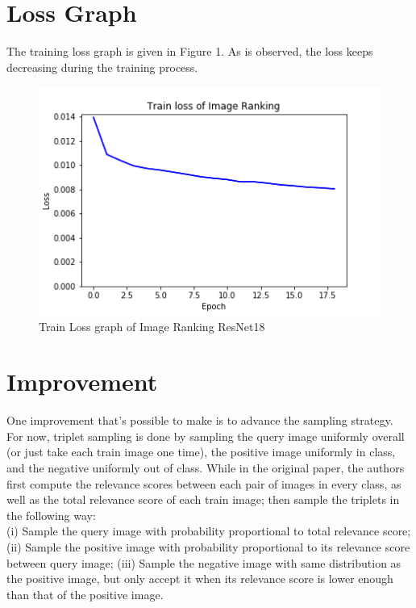 \documentclass[15pt]{article}
\begin{document}
\section{Loss Graph}
The training loss graph is given in Figure 1. As is observed, the loss keeps decreasing during the training process.
\begin{figure}
\centering
\includegraphics[width=\textwidth]{"Train_Loss_Plot"}
\caption{Train Loss graph of Image Ranking ResNet18}
\end{figure}

\section{Improvement}
One improvement that's possible to make is to advance the sampling strategy. \\
For now, triplet sampling is done by sampling the query image uniformly overall (or just take each train image one time), the positive image uniformly in class, and the negative uniformly out of class. While in the original paper, the authors first compute the relevance scores between each pair of images in every class, as well as the total relevance score of each train image; then sample the triplets in the following way: \\
(i) Sample the query image with probability proportional to total relevance score; (ii) Sample the positive image with probability proportional to its relevance score between query image; (iii) Sample the negative image with same distribution as the positive image, but only accept it when its relevance score is lower enough than that of the positive image.
\end{document}
